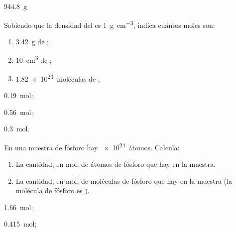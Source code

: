 \begin{solution}
  \SI{944.8}{\gram}
\end{solution}




\begin{exercise}[
    tags    = {termodinámica, entalpía, entalpia de reacción, calor},
    topics  = {química, termoquímica, termodinámica},
    source  = {FQ 1B OXF 2015, p43, e34},
  ]
  Sabiendo que la densidad del  es \SI{1}{\gram\per\cubic\centi\meter}, indica cuántos moles son:
  \begin{enumerate}
    \item \SI{3.42}{\gram} de ;
    \item \SI{10}{\cubic\centi\meter} de ;
    \item \SI{1.82e23}{moléculas} de ;
  \end{enumerate}
\end{exercise}

\begin{solution}
  \begin{enumerate*}
    \item \SI{0.19}{\mole};
    \item \SI{0.56}{\mole};
    \item \SI{0.3}{\mole}.
  \end{enumerate*}
\end{solution}




\begin{exercise}[
    tags    = {termodinámica, entalpía, entalpia de reacción, calor},
    topics  = {química, termoquímica, termodinámica},
    source  = {FQ 1B OXF 2015, p43, e37},
  ]
  En una muestra de fósforo hay \SI{e24}{átomos}. Calcula:
  \begin{enumerate}
    \item La cantidad, en mol, de átomos de fósforo que hay en la muestra.
    \item La cantidad, en mol, de moléculas de fósforo que hay en la muestra (la molécula de fósforo es ).
  \end{enumerate}
\end{exercise}

\begin{solution}
  \begin{enumerate*}
    \item \SI{1.66}{\mole};
    \item \SI{0.415}{\mole};
  \end{enumerate*}
\end{solution}
